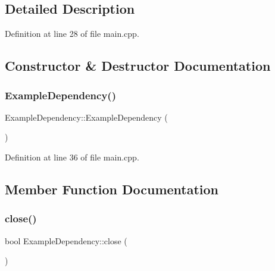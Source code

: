 \subsection{Detailed Description}


Definition at line 28 of file main.\+cpp.



\subsection{Constructor \& Destructor Documentation}
\mbox{\label{classExampleDependency_ae60df3258084dbc786b21cda98f9071b}} 
\subsubsection{\texorpdfstring{Example\+Dependency()}{ExampleDependency()}}
{\footnotesize\ttfamily Example\+Dependency\+::\+Example\+Dependency (\begin{DoxyParamCaption}{ }\end{DoxyParamCaption})\hspace{0.3cm}{\ttfamily [inline]}}



Definition at line 36 of file main.\+cpp.



\subsection{Member Function Documentation}
\mbox{\label{classExampleDependency_ad084c43e05a088043b80e9ff08de5984}} 
\subsubsection{\texorpdfstring{close()}{close()}}
{\footnotesize\ttfamily bool Example\+Dependency\+::close (\begin{DoxyParamCaption}{ }\end{DoxyParamCaption})\hspace{0.3cm}{\ttfamily [inline]}}



